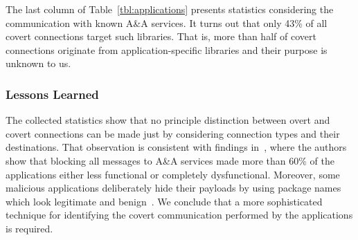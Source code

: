 The last column of Table~\ref{tbl:applications} 
%
presents statistics considering the communication with known A\&A services. 
It turns out that only 43\% of all covert connections target such libraries. 
That is, more than half of covert connections originate from application-specific libraries and their purpose is unknown to us.



\subsubsection{Lessons Learned}
The collected statistics show that no principle distinction between overt and covert connections  
can be made just by considering connection types and their destinations. 
That observation is consistent with findings in~\cite{Hornyack:Han:Jung:Schechter:Wetherall:CCS11}, where the authors 
show that blocking all messages to A\&A services made more than 60\% of the applications either less functional or completely dysfunctional. 
Moreover, some malicious applications deliberately hide their payloads by using package names which look legitimate and benign~\cite{Zhou:Jiang:SP2012}. We conclude that a more sophisticated 
technique for identifying the covert communication performed by the applications is required. 

